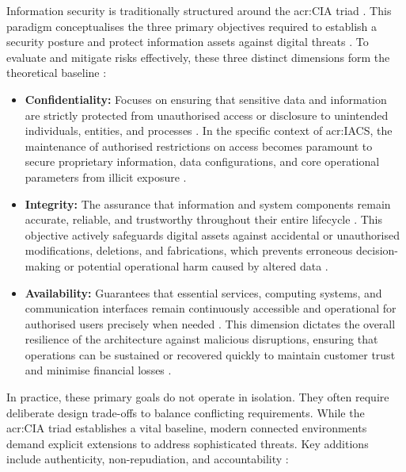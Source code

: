 Information security is traditionally structured around the \gls{acr:CIA} triad \cite{CIAtriadEICTA2026} \cite[p. 1]{app16126260}. This paradigm conceptualises the three primary objectives required to establish a security posture and protect information assets against digital threats \cite[p. 5]{Khanna2024}. To evaluate and mitigate risks effectively, these three distinct dimensions form the theoretical baseline \cite[p. 24]{app16126260}:

\begin{itemize}
	\item \textbf{Confidentiality:} Focuses on ensuring that sensitive data and information are strictly protected from unauthorised access or disclosure to unintended individuals, entities, and processes \cite[p. 4]{Khanna2024} \cite[p. 3]{app16126260}. In the specific context of \gls{acr:IACS}, the maintenance of authorised restrictions on access becomes paramount to secure proprietary information, data configurations, and core operational parameters from illicit exposure \cite[p. 23]{IEC62443-3-3}.
	\item \textbf{Integrity:} The assurance that information and system components remain accurate, reliable, and trustworthy throughout their entire lifecycle \cite[p. 4]{Khanna2024} \cite[p. 3]{app16126260}. This objective actively safeguards digital assets against accidental or unauthorised modifications, deletions, and fabrications, which prevents erroneous decision-making or potential operational harm caused by altered data \cite[pp. 4]{Khanna2024}.
	\item \textbf{Availability:} Guarantees that essential services, computing systems, and communication interfaces remain continuously accessible and operational for authorised users precisely when needed \cite[pp. 4]{Khanna2024} \cite[p. 3]{app16126260}. This dimension dictates the overall resilience of the architecture against malicious disruptions, ensuring that operations can be sustained or recovered quickly to maintain customer trust and minimise financial losses \cite[p. 5]{Khanna2024}.
\end{itemize}

In practice, these primary goals do not operate in isolation. They often require deliberate design trade-offs to balance conflicting requirements. While the \gls{acr:CIA} triad establishes a vital baseline, modern connected environments demand explicit extensions to address sophisticated threats. Key additions include authenticity, non-repudiation, and accountability \cite[pp. 102]{doCarmo2025} \cite{CIAtriadEICTA2026}:

